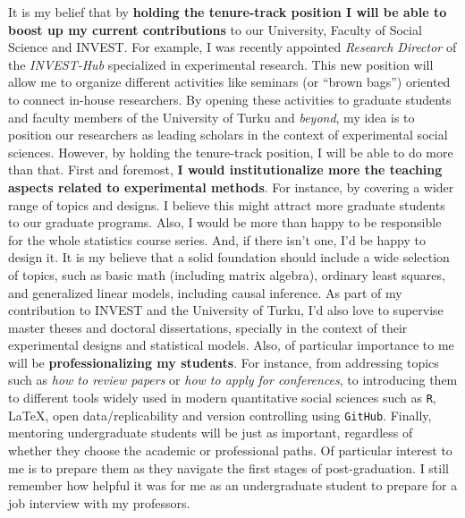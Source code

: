 \documentclass[10pt,stdletter,dateno,sigleft]{newlfm} %
\begin{document}
\begin{newlfm}
It is my belief that by {\bf holding the tenure-track position I will be able to boost up my current contributions} to our University, Faculty of Social Science and INVEST. For example, I was recently appointed \emph{Research Director} of the \emph{INVEST-Hub} specialized in experimental research. This new position will allow me to organize different activities like seminars (or ``brown bags'') oriented to connect in-house researchers. By opening these activities to graduate students and faculty members of the University of Turku and \emph{beyond}, my idea is to position our researchers as leading scholars in the context of experimental social sciences. However, by holding the tenure-track position, I will be able to do more than that. First and foremost, {\bf I would institutionalize more the teaching aspects related to experimental methods}. For instance, by covering a wider range of topics and designs. I believe this might attract more graduate students to our graduate programs. Also, I would be more than happy to be responsible for the whole statistics course series. And, if there isn't one, I'd be happy to design it. It is my believe that a solid foundation should include a wide selection of topics, such as basic math (including matrix algebra), ordinary least squares, and generalized linear models, including causal inference. As part of my contribution to INVEST and the University of Turku, I'd also love to supervise master theses and doctoral dissertations, specially in the context of their experimental designs and statistical models. Also, of particular importance to me will be {\bf professionalizing my students}. For instance, from addressing topics such as \emph{how to review papers} or \emph{how to apply for conferences}, to introducing them to different tools widely used in modern quantitative social sciences such as \texttt{R}, \LaTeX\;, open data/replicability and version controlling using \texttt{GitHub}. Finally, mentoring undergraduate students will be just as important, regardless of whether they choose the academic or professional paths. Of particular interest to me is to prepare them as they navigate the first stages of post-graduation. I still remember how helpful it was for me as an undergraduate student to prepare for a job interview with my professors.


\end{newlfm}
\end{document}
